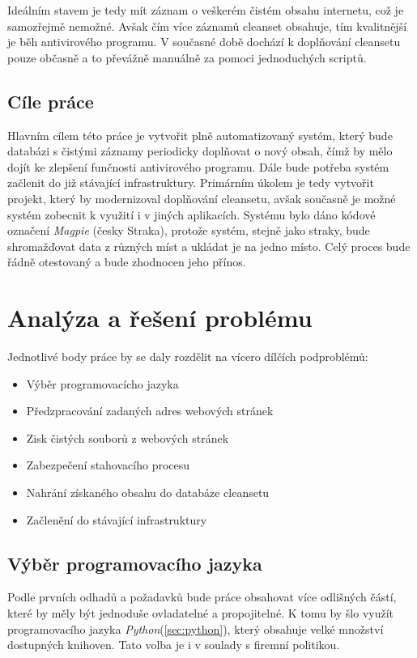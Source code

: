 \documentclass[thesis=M,czech,hidelinks]{FITthesis}[2013/05/06]
\begin{document}
Ideálním stavem je tedy mít záznam o veškerém čistém obsahu internetu, což je samozřejmě nemožné. Avšak čím více záznamů cleanset obsahuje, tím kvalitnější je běh antivirového programu. V současné době dochází k doplňování cleansetu pouze občasně a to převážně manuálně za pomoci jednoduchých scriptů.

\section{Cíle práce} 
 Hlavním cílem této práce je vytvořit plně automatizovaný systém, který bude databázi s čistými záznamy periodicky doplňovat o nový obsah, čímž by mělo dojít ke zlepšení funčnosti antivirového programu. Dále bude potřeba systém začlenit do již stávající  infrastruktury. Primárním úkolem je tedy vytvořit projekt, který by modernizoval doplňování cleansetu, avšak současně je možné systém zobecnit k využití i v jiných aplikacích. Systému bylo dáno kódové označení \textit{Magpie} (česky Straka), protože systém, stejně jako straky, bude shromažďovat data z různých míst a ukládat je na jedno místo. Celý proces bude řádně otestovaný a bude zhodnocen jeho přínos.


\chapter{Analýza a řešení problému}
Jednotlivé body práce by se daly rozdělit na vícero dílčích podproblémů:

\begin{itemize}
	\item Výběr programovacícho jazyka
	\item Předzpracování zadaných adres webových stránek
	\item Zisk čistých souborů z webových stránek
	\item Zabezpečení stahovacího procesu
	\item Nahrání získaného obsahu do databáze cleansetu
	\item Začlenění do stávající infrastruktury
\end{itemize}

\section{Výběr programovacího jazyka}
Podle prvních odhadů a požadavků bude práce obsahovat více odlišných částí, které by měly být jednoduše ovladatelné a propojitelné. K tomu by šlo využít programovacího jazyka \textit{Python}(\ref{sec:python}), který obsahuje velké množství dostupných knihoven. Tato volba je i v soulady s firemní politikou.
\end{document}
